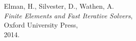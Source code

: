 \documentclass[11pt,a4paper]{article}
\begin{document}
\begin{thebibliography}{99}


Elman, H., Silvester, D., Wathen, A. \\
\emph{Finite Elements and Fast Iterative Solvers},\\
Oxford University Press,\\
2014.










\end{thebibliography}
\end{document}
